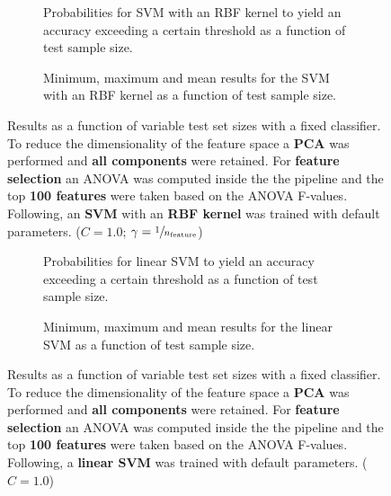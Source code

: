 \begin{figure}
    \captionsetup[subfigure]{justification=justified,singlelinecheck=false}
    \begin{subfigure}[t]{0.61\textwidth}
        
        \caption{Probabilities for SVM with an RBF kernel to yield an accuracy exceeding a certain threshold as a function of test sample size.}
    \end{subfigure}
    \hspace{3.0mm}
    \begin{subfigure}[t]{0.34\textwidth}
        
        \caption{Minimum, maximum and mean results for the SVM with an RBF kernel as a function of test sample size.}
    \end{subfigure}
    \caption[Effects of varying test sample size. SVM (kernel = RBF); Preprocessing: PCA ($n_\text{components} = \text{all}$); ANOVA feature selection ($k_\text{best} = \num{100}$)]{Results as a function of variable test set sizes with a fixed classifier. To reduce the dimensionality of the feature space a \textbf{PCA} was performed and \textbf{all components} were retained. For \textbf{feature selection} an ANOVA was computed inside the the pipeline and the top \textbf{100 features} were taken based on the ANOVA F-values. Following, an \textbf{{SVM}} with an \textbf{{RBF kernel}} was trained with default parameters. ($C=\num{1.0}$; $\gamma=\sfrac{1}{n_\text{feature}}$)}
    \label{fig:PCA_all_components_100_best_selected_SVC}
\end{figure}

\begin{figure}
    \captionsetup[subfigure]{justification=justified,singlelinecheck=false}
    \begin{subfigure}[t]{0.61\textwidth}
        
        \caption{Probabilities for linear SVM to yield an accuracy exceeding a certain threshold as a function of test sample size.}
    \end{subfigure}
    \hspace{3.0mm}
    \begin{subfigure}[t]{0.34\textwidth}
        
        \caption{Minimum, maximum and mean results for the linear SVM as a function of test sample size.}
    \end{subfigure}
    \caption[Effects of varying test sample size. Linear SVM; Preprocessing: PCA ($n_\text{components} = \text{all}$); ANOVA feature selection ($k_\text{best} = \num{100}$)]{Results as a function of variable test set sizes with a fixed classifier. To reduce the dimensionality of the feature space a \textbf{PCA} was performed and \textbf{all components} were retained. For \textbf{feature selection} an ANOVA was computed inside the the pipeline and the top \textbf{100 features} were taken based on the ANOVA F-values. Following, a \textbf{{linear SVM}} was trained with default parameters. ($C=\num{1.0}$)}
    \label{fig:PCA_all_components_100_best_selected_LinearSVC}
\end{figure}


